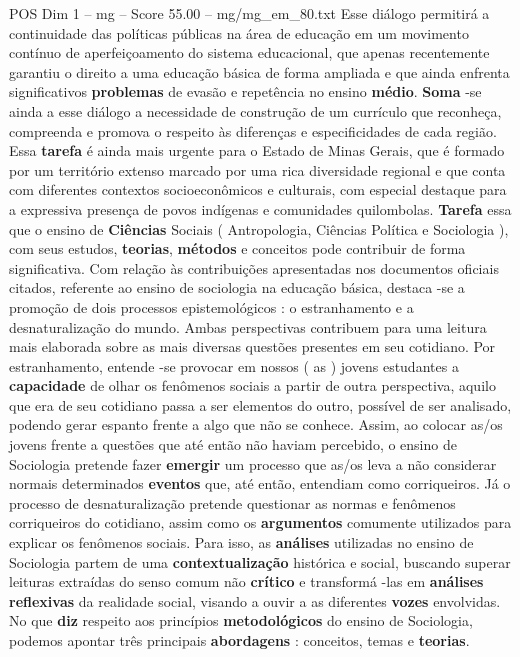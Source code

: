 \begin{textsample}{POS Dim 1 – mg – Score 55.00 – mg/mg\_em\_80.txt}
Esse diálogo permitirá a continuidade das políticas públicas na área de educação em um movimento contínuo de aperfeiçoamento do sistema educacional, que apenas recentemente garantiu o direito a uma educação básica de forma ampliada e que ainda enfrenta significativos \textbf{problemas} de evasão e repetência no ensino \textbf{médio}. \textbf{Soma} -se ainda a esse diálogo a necessidade de construção de um currículo que reconheça, compreenda e promova o respeito às diferenças e especificidades de cada região.
Essa \textbf{tarefa} é ainda mais urgente para o Estado de Minas Gerais, que é formado por um território extenso marcado por uma rica diversidade regional e que conta com diferentes contextos socioeconômicos e culturais, com especial destaque para a expressiva presença de povos indígenas e comunidades quilombolas. \textbf{Tarefa} essa que o ensino de \textbf{Ciências} Sociais ( Antropologia, Ciências Política e Sociologia ), com seus estudos, \textbf{teorias}, \textbf{métodos} e conceitos pode contribuir de forma significativa.
Com relação às contribuições apresentadas nos documentos oficiais citados, referente ao ensino de sociologia na educação básica, destaca -se a promoção de dois processos epistemológicos : o estranhamento e a desnaturalização do mundo.
Ambas perspectivas contribuem para uma leitura mais elaborada sobre as mais diversas questões presentes em seu cotidiano.
Por estranhamento, entende -se provocar em nossos ( as ) jovens estudantes a \textbf{capacidade} de olhar os fenômenos sociais a partir de outra perspectiva, aquilo que era de seu cotidiano passa a ser elementos do outro, possível de ser analisado, podendo gerar espanto frente a algo que não se conhece.
Assim, ao colocar as/os jovens frente a questões que até então não haviam percebido, o ensino de Sociologia pretende fazer \textbf{emergir} um processo que as/os leva a não considerar normais determinados \textbf{eventos} que, até então, entendiam como corriqueiros.
Já o processo de desnaturalização pretende questionar as normas e fenômenos corriqueiros do cotidiano, assim como os \textbf{argumentos} comumente utilizados para explicar os fenômenos sociais.
Para isso, as \textbf{análises} utilizadas no ensino de Sociologia partem de uma \textbf{contextualização} histórica e social, buscando superar leituras extraídas do senso comum não \textbf{crítico} e transformá -las em \textbf{análises} \textbf{reflexivas} da realidade social, visando a ouvir a as diferentes \textbf{vozes} envolvidas.
No que \textbf{diz} respeito aos princípios \textbf{metodológicos} do ensino de Sociologia, podemos apontar três principais \textbf{abordagens} : conceitos, temas e \textbf{teorias}.

\end{textsample}
